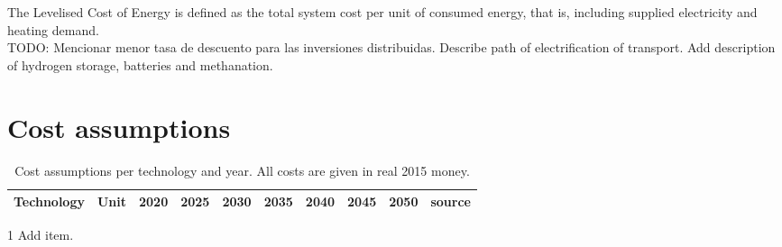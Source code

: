 \documentclass[3p]{elsarticle} %
\begin{document}
The Levelised Cost of Energy is defined as the total system cost per unit of consumed energy, that is, including supplied electricity and heating demand. \\

\textcolor[rgb]{1,0,0}{TODO:  
Mencionar menor tasa de descuento para las inversiones distribuidas.
Describe path of electrification of transport.
Add description of hydrogen storage, batteries and methanation. }




\section{Cost assumptions}	

\begin{table}[!b]
\footnotesize
\centering
\begin{threeparttable}
\caption{Cost assumptions per technology and year. All costs are given in real 2015 money. } \label{tab:cost per year}
\centering
\begin{tabularx}{18cm}{lccccccccr}
\toprule

Technology\tnote{1}& Unit & 2020&2025&2030&2035&2040&2045&2050&source\\
\midrule



\bottomrule
\end{tabularx}
\begin{tablenotes}
\item[1] Add item.
\end{tablenotes}
\end{threeparttable}
\end{table}
\end{document}
